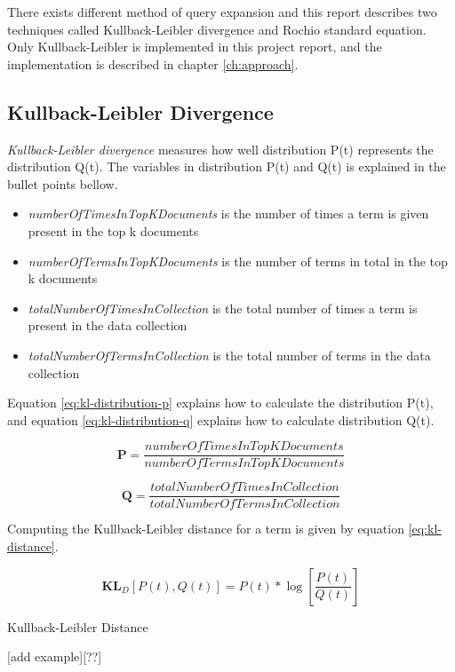 There exists different method of query expansion and this report describes two techniques called Kullback-Leibler divergence and Rochio standard equation.
Only Kullback-Leibler is implemented in this project report, and the implementation is described in chapter \ref{ch:approach}.

\subsection{Kullback-Leibler Divergence}
\textit{Kullback-Leibler divergence} measures how well distribution P(t) represents the distribution Q(t).
The variables in distribution P(t) and Q(t) is explained in the bullet points bellow.

\begin{itemize}
	\item \textit{numberOfTimesInTopKDocuments} is the number of times a term is given present in the top k documents
	\item \textit{numberOfTermsInTopKDocuments} is the number of terms in total in the top k documents
	\item \textit{totalNumberOfTimesInCollection} is the total number of times a term is present in the data collection
	\item \textit{totalNumberOfTermsInCollection} is the total number of terms in the data collection
\end{itemize}

Equation \ref{eq:kl-distribution-p} explains how to calculate the distribution P(t),
and equation \ref{eq:kl-distribution-q} explains how to calculate distribution Q(t).

\begin{cequation}[H]
	\begin{equation}
		\mathbf{P} = \frac{numberOfTimesInTopKDocuments}{numberOfTermsInTopKDocuments}
	\end{equation}
	\caption{}
  \label{eq:kl-distribution-p}
\end{cequation}

\begin{cequation}[H]
	\begin{equation}
		\mathbf{Q} = \frac{totalNumberOfTimesInCollection}{totalNumberOfTermsInCollection}
	\end{equation}
	\caption{}
  \label{eq:kl-distribution-q}
\end{cequation}

Computing the Kullback-Leibler distance for a term is given by equation \ref{eq:kl-distance}.

\begin{cequation}[H]
	\begin{equation}
		\mathbf{KL}_D[P(t), Q(t)] = P(t)*\log{[\frac{P(t)}{Q(t)}]}
	\end{equation}
	\caption{Kullback-Leibler Distance}
  \label{eq:kl-distance}
\end{cequation}

[add example][??]
